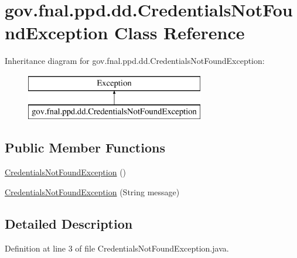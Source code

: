 \hypertarget{classgov_1_1fnal_1_1ppd_1_1dd_1_1CredentialsNotFoundException}{\section{gov.\-fnal.\-ppd.\-dd.\-Credentials\-Not\-Found\-Exception Class Reference}
\label{classgov_1_1fnal_1_1ppd_1_1dd_1_1CredentialsNotFoundException}
}
Inheritance diagram for gov.\-fnal.\-ppd.\-dd.\-Credentials\-Not\-Found\-Exception\-:\begin{figure}[H]
\begin{center}
\leavevmode
\includegraphics[height=2.000000cm]{classgov_1_1fnal_1_1ppd_1_1dd_1_1CredentialsNotFoundException}
\end{center}
\end{figure}
\subsection*{Public Member Functions}
\begin{DoxyCompactItemize}
\item 
\hyperlink{classgov_1_1fnal_1_1ppd_1_1dd_1_1CredentialsNotFoundException_a8d1a76684c918f79cffe323308a77010}{Credentials\-Not\-Found\-Exception} ()
\item 
\hyperlink{classgov_1_1fnal_1_1ppd_1_1dd_1_1CredentialsNotFoundException_a3ad6d4567462d260cb411d384065d12c}{Credentials\-Not\-Found\-Exception} (String message)
\end{DoxyCompactItemize}


\subsection{Detailed Description}


Definition at line 3 of file Credentials\-Not\-Found\-Exception.\-java.



